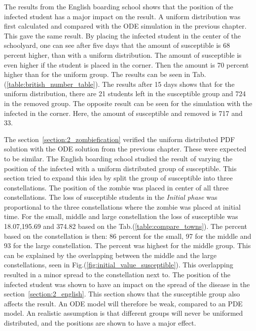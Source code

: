 \documentclass[%
twoside,                 %
final,                   %
chapterprefix=true,      %
open=right               %
10pt]{book}
\begin{document}
\vspace{3mm}




\vspace{3mm}


The results from the English boarding school shows that the position of the infected student has a major impact on the result. A uniform distribution was first calculated and compared with the ODE simulation in the previous chapter. This gave the same result. By placing the infected student in the center of the schoolyard, one can see after five days that the amount of susceptible is 68 percent higher, than with a uniform distribution. The amount of susceptible is even higher if the student is placed in the corner. Then the amount is 70 percent higher than for the uniform group. The results can be seen in Tab.(\ref{table:british_number_table}). The results after 15 days shows that for the uniform distribution, there are 21 students left in the susceptible group and 724 in the removed group. The opposite result can be seen for the simulation with the infected in the corner. Here, the amount of susceptible and removed is 717 and 33. 


\vspace{3mm}




\vspace{3mm}


The section~\ref{section:2_zombiefication} verified the uniform distributed PDF solution with the ODE solution from the previous chapter. These were expected to be similar. The English boarding school studied the result of varying the position of the infected with a uniform distributed group of susceptible. This section tried to expand this idea by split the group of susceptible into three constellations. The position of the zombie was placed in center of all three constellations. The loss of susceptible students in the \emph{Initial phase} was proportional to the three constellations where the zombie was placed at initial time. For the small, middle and large constellation the loss of susceptible was 18.07,195.69 and 374.82 based on the Tab.(\ref{table:compare_towns}). The percent based on the constellation is then: 86 percent for the small, 97 for the middle and 93 for the large constellation. The percent was highest for the middle group. This can be explained by the overlapping between the middle and the large constellations, seen in Fig.(\ref{fig:initial_value_susceptible}). This overlapping resulted in a minor spread to the constellation next to. The position of the infected student was shown to have an impact on the spread of the disease in the section~\ref{section:2_english}. This section shows that the susceptible group also affects the result. An ODE model will therefore be weak, compared to an PDE model. An realistic assumption is that different groups will never be uniformed distributed, and the positions are shown to have a major effect.
\end{document}
